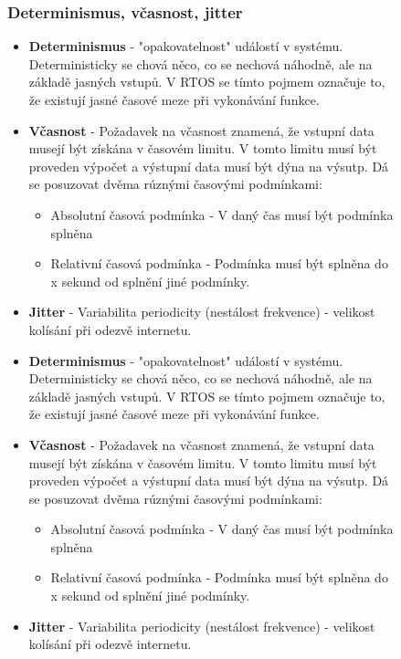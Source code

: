 \begin{figure}[h]
\subsubsection*{Determinismus, včasnost, jitter}
\begin{itemize}
  \item \textbf{Determinismus} - "opakovatelnost" událostí v systému. Deterministicky se chová něco, co se nechová náhodně, ale na základě jasných vstupů. V RTOS se tímto pojmem označuje to, že existují jasné časové meze při vykonávání funkce.
  \item  \textbf{Včasnost} - Požadavek na včasnost znamená, že vstupní data musejí být získána v časovém limitu. V tomto limitu musí být proveden výpočet a výstupní data musí být dýna na výsutp. Dá se posuzovat dvěma rúznými časovými podmínkami: \begin{itemize}
    \item Absolutní časová podmínka - V daný čas musí být podmínka splněna
    \item Relativní časová podmínka - Podmínka musí být splněna do x sekund od splnění jiné podmínky.
  \end{itemize}
  \item \textbf{Jitter} - Variabilita periodicity (nestálost frekvence) - velikost kolísání při odezvě internetu.
    \item \textbf{Determinismus} - "opakovatelnost" událostí v systému. Deterministicky se chová něco, co se nechová náhodně, ale na základě jasných vstupů. V RTOS se tímto pojmem označuje to, že existují jasné časové meze při vykonávání funkce.
    \item  \textbf{Včasnost} - Požadavek na včasnost znamená, že vstupní data musejí být získána v časovém limitu. V tomto limitu musí být proveden výpočet a výstupní data musí být dýna na výsutp. Dá se posuzovat dvěma rúznými časovými podmínkami: \begin{itemize}
              \item Absolutní časová podmínka - V daný čas musí být podmínka splněna
              \item Relativní časová podmínka - Podmínka musí být splněna do x sekund od splnění jiné podmínky.
          \end{itemize}
    \item \textbf{Jitter} - Variabilita periodicity (nestálost frekvence) - velikost kolísání při odezvě internetu.
\end{itemize}


\end{figure}
